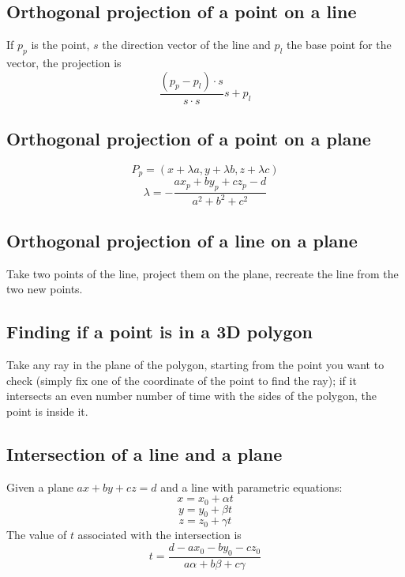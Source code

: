 \subsection{Orthogonal projection of a point on a line}
If $p_p$ is the point, $s$ the direction vector of the line and $p_l$ the base point for the vector, the projection is
$$\frac{(p_p-p_l)\cdot s}{s\cdot s}s+p_l$$
\subsection{Orthogonal projection of a point on a plane}
$$P_p=(x+\lambda a, y+\lambda b, z + \lambda c)$$
$$\lambda = -\frac{ax_p+by_p+cz_p-d}{a^2+b^2+c^2}$$
\subsection{Orthogonal projection of a line on a plane}
Take two points of the line, project them on the plane, recreate the line from the two new points.
\subsection{Finding if a point is in a 3D polygon}
Take any ray in the plane of the polygon, starting from the point you want to check (simply fix one of the coordinate of the point to find the ray); if it intersects an even number number of time with the sides of the polygon, the point is inside it.
\subsection{Intersection of a line and a plane}
Given a plane $ax+by+cz=d$ and a line with parametric equations:
$$x=x_0+\alpha t$$
$$y=y_0+\beta t$$
$$z=z_0+\gamma t$$
The value of $t$ associated with the intersection is
$$t=\frac{d-ax_0-by_0-cz_0}{a\alpha+b\beta+c\gamma}$$
